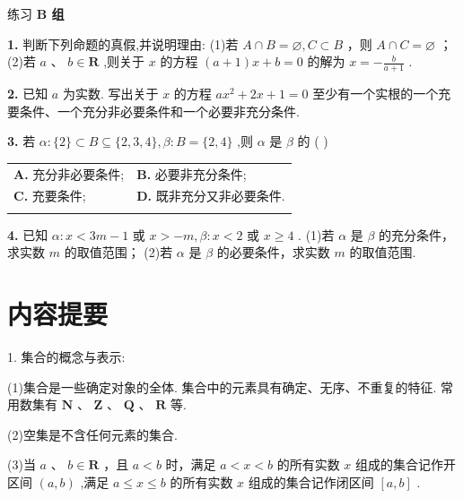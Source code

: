 \documentclass[a4paper,10pt,oneside,fontset=none]{ctexbook}
\renewcommand{\geq}{\geqslant}
\renewcommand{\leq}{\leqslant}
\newenvironment{exercise}[1][]{\begin{exBox}{练习}{#1}}{\end{exBox}}
\numberwithin{equation}{chapter}
\begin{document}
\begin{exercise}
\textbf{B 组}\par\vspace{0.5em}
\textbf{1.} 判断下列命题的真假,并说明理由: (1)若 $A \cap  B = \varnothing , C \subset  B$ ，则 $A \cap  C = \varnothing$ ； (2)若 $a\text{ 、 }b \in  \mathbf{R}$ ,则关于 $x$ 的方程 $\left( {a + 1}\right) x + b = 0$ 的解为 $x =  - \frac{b}{a + 1}$ .
\par\vspace{0.8em}
\textbf{2.} 已知 $a$ 为实数. 写出关于 $x$ 的方程 $a{x}^{2} + {2x} + 1 = 0$ 至少有一个实根的一个充要条件、一个充分非必要条件和一个必要非充分条件.
\par\vspace{0.8em}
\textbf{3.} 若 $\alpha  : \{ 2\}  \subset  B \subseteq  \{ 2,3,4\} ,\beta  : B = \{ 2,4\}$ ,则 $\alpha$ 是 $\beta$ 的 ( )
\par\vspace{0.3em}
\begin{center}
\begin{tabular}{@{}p{}p{}@{}}
\textbf{A.} 充分非必要条件; & \textbf{B.} 必要非充分条件; \\\vspace{0.2em}
\textbf{C.} 充要条件; & \textbf{D.} 既非充分又非必要条件. \\\vspace{0.2em}
\end{tabular}
\end{center}
\par\vspace{0.8em}
\textbf{4.} 已知 $\alpha  : x < {3m} - 1$ 或 $x >  - m,\beta  : x < 2$ 或 $x \geq  4$ . (1)若 $\alpha$ 是 $\beta$ 的充分条件，求实数 $m$ 的取值范围； (2)若 $\alpha$ 是 $\beta$ 的必要条件，求实数 $m$ 的取值范围.
\end{exercise}

\section*{内容提要}

1. 集合的概念与表示:

(1)集合是一些确定对象的全体. 集合中的元素具有确定、无序、不重复的特征. 常用数集有 $\mathbf{N}\text{ 、 }\mathbf{Z}\text{ 、 }\mathbf{Q}\text{ 、 }\mathbf{R}$ 等.

(2)空集是不含任何元素的集合.

(3)当 $a\text{ 、 }b \in  \mathbf{R}$ ，且 $a < b$ 时，满足 $a < x < b$ 的所有实数 $x$ 组成的集合记作开区间 $\left( {a, b}\right)$ ,满足 $a \leq  x \leq  b$ 的所有实数 $x$ 组成的集合记作闭区间 $\left\lbrack  {a, b}\right\rbrack$ .
\end{document}
